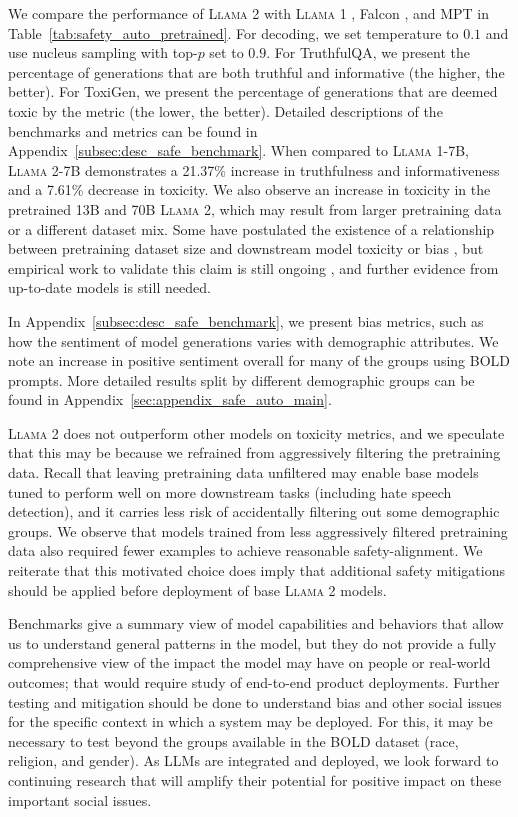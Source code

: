 We compare the performance of \textsc{Llama 2} with \textsc{Llama 1} \citep{Touvron2023LLaMAOA}, Falcon \citep{falcon40b}, and MPT \citep{MosaicML2023Introducing} in Table~\ref{tab:safety_auto_pretrained}. For decoding, we set temperature to $0.1$ and use nucleus sampling \citep{nucleus_sampling} with top-$p$ set to $0.9$. For TruthfulQA, we present the percentage of generations that are both truthful and informative (the higher, the better). For ToxiGen, we present the percentage of generations that are deemed toxic by the metric (the lower, the better). Detailed descriptions of the benchmarks and metrics can be found in Appendix~\ref{subsec:desc_safe_benchmark}. 
When compared to \textsc{Llama 1}-7B, \textsc{Llama 2}-7B demonstrates a 21.37\% increase in truthfulness and informativeness and a 7.61\% decrease in toxicity. We also observe an increase in toxicity in the pretrained 13B and 70B \textsc{Llama 2}, which may result from larger pretraining data or a different dataset mix. Some have postulated the existence of a relationship between pretraining dataset size and downstream model toxicity or bias \citep{bender2021dangers}, but empirical work to validate this claim is still ongoing \citep{dodge-etal-2021-documenting, smith2021hi, tal-etal-2022-fewer}, and further evidence from up-to-date models is still needed. 

In Appendix~\ref{subsec:desc_safe_benchmark}, we present bias metrics, such as how the sentiment of model generations varies with demographic attributes. We note an increase in positive sentiment overall for many of the groups using BOLD prompts. More detailed results split by different demographic groups can be found in Appendix~\ref{sec:appendix_safe_auto_main}. 

 \textsc{Llama 2} does not outperform other models on toxicity metrics, and we speculate that this may be because we refrained from aggressively filtering the pretraining data. Recall that leaving pretraining data unfiltered may enable base models tuned to perform well on more downstream tasks (including hate speech detection), and it carries less risk of accidentally filtering out some demographic groups. We observe that models trained from less aggressively filtered pretraining data also required fewer examples to achieve reasonable safety-alignment. We reiterate that this motivated choice does imply that additional safety mitigations should be applied before deployment of base \textsc{Llama 2} models.

Benchmarks give a summary view of model capabilities and behaviors that allow us to understand general patterns in the model, but they do not provide a fully comprehensive view of the impact the model may have on people or real-world outcomes; that would require study of end-to-end product deployments. Further testing and mitigation should be done to understand bias and other social issues for the specific context in which a system may be deployed. For this, it may be necessary to test beyond the groups available in the BOLD dataset (race, religion, and gender). As LLMs are integrated and deployed, we look forward to continuing research that will amplify their potential for positive impact on these important social issues. 

